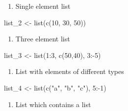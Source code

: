 \documentclass[
  letterpaper,
  DIV=11,
  numbers=noendperiod]{scrreprt}
\newenvironment{Shaded}{}{}
\newcommand{\DecValTok}[1]{\textcolor[rgb]{0.00,0.36,0.77}{#1}}
\newcommand{\FunctionTok}[1]{\textcolor[rgb]{0.44,0.26,0.76}{#1}}
\newcommand{\NormalTok}[1]{\textcolor[rgb]{0.14,0.16,0.18}{#1}}
\newcommand{\OtherTok}[1]{\textcolor[rgb]{0.44,0.26,0.76}{#1}}
\newcommand{\SpecialCharTok}[1]{\textcolor[rgb]{0.00,0.36,0.77}{#1}}
\newcommand{\StringTok}[1]{\textcolor[rgb]{0.01,0.18,0.38}{#1}}
\providecommand{\tightlist}{%
  \setlength{\itemsep}{0pt}\setlength{\parskip}{0pt}}\usepackage{longtable,booktabs,array}
\begin{document}
\begin{enumerate}
\def\labelenumi{\alph{enumi}.}
\setcounter{enumi}{1}
\tightlist
\item
  Single element list
\end{enumerate}

\begin{Shaded}
\begin{Highlighting}[]
\NormalTok{list\_2 }\OtherTok{\textless{}{-}} \FunctionTok{list}\NormalTok{(}\FunctionTok{c}\NormalTok{(}\DecValTok{10}\NormalTok{, }\DecValTok{30}\NormalTok{, }\DecValTok{50}\NormalTok{))}
\end{Highlighting}
\end{Shaded}

\begin{enumerate}
\def\labelenumi{\alph{enumi}.}
\setcounter{enumi}{2}
\tightlist
\item
  Three element list
\end{enumerate}

\begin{Shaded}
\begin{Highlighting}[]
\NormalTok{list\_3 }\OtherTok{\textless{}{-}} \FunctionTok{list}\NormalTok{(}\DecValTok{1}\SpecialCharTok{:}\DecValTok{3}\NormalTok{, }\FunctionTok{c}\NormalTok{(}\DecValTok{50}\NormalTok{,}\DecValTok{40}\NormalTok{), }\DecValTok{3}\SpecialCharTok{:{-}}\DecValTok{5}\NormalTok{)}
\end{Highlighting}
\end{Shaded}

\begin{enumerate}
\def\labelenumi{\alph{enumi}.}
\setcounter{enumi}{3}
\tightlist
\item
  List with elements of different types
\end{enumerate}

\begin{Shaded}
\begin{Highlighting}[]
\NormalTok{list\_4 }\OtherTok{\textless{}{-}} \FunctionTok{list}\NormalTok{(}\FunctionTok{c}\NormalTok{(}\StringTok{"a"}\NormalTok{, }\StringTok{"b"}\NormalTok{, }\StringTok{"c"}\NormalTok{), }\DecValTok{5}\SpecialCharTok{:{-}}\DecValTok{1}\NormalTok{)}
\end{Highlighting}
\end{Shaded}

\begin{enumerate}
\def\labelenumi{\alph{enumi}.}
\setcounter{enumi}{4}
\tightlist
\item
  List which contains a list
\end{enumerate}
\end{document}
